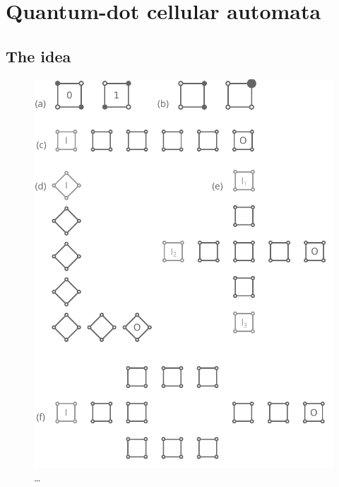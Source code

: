\chapter{Quantum-dot cellular automata}
\graphicspath{{../gfx/chapter01/}}


\section{The idea}

\begin{figure}
  \center
  \includegraphics{intro_qca}
  \caption{\ldots}
  \label{fig:intro_qca}
\end{figure}

